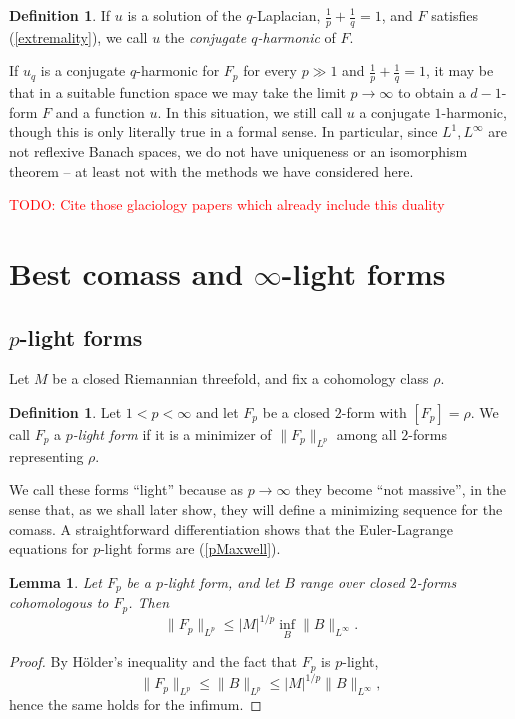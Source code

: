 \documentclass[reqno,11pt]{amsart}
\newcommand{\dfn}[1]{\emph{#1}\index{#1}}
\newtheorem{lemma}[theorem]{Lemma}
\theoremstyle{definition}
\newtheorem{definition}[theorem]{Definition}
\numberwithin{equation}{section}
\newcommand\todo[1]{\textcolor{red}{TODO: #1}}
\begin{document}
\begin{definition}
If $u$ is a solution of the $q$-Laplacian, $\frac{1}{p} + \frac{1}{q} = 1$, and $F$ satisfies (\ref{extremality}), we call $u$ the \dfn{conjugate $q$-harmonic} of $F$.
\end{definition}

If $u_q$ is a conjugate $q$-harmonic for $F_p$ for every $p \gg 1$ and $\frac{1}{p} + \frac{1}{q} = 1$, it may be that in a suitable function space we may take the limit $p \to \infty$ to obtain a $d-1$-form $F$ and a function $u$.
In this situation, we still call $u$ a conjugate $1$-harmonic, though this is only literally true in a formal sense.
In particular, since $L^1, L^\infty$ are not reflexive Banach spaces, we do not have uniqueness or an isomorphism theorem -- at least not with the methods we have considered here.

\todo{Cite those glaciology papers which already include this duality}


\section{Best comass and \texorpdfstring{$\infty$-light forms}{infinity-light forms}}
\subsection{\texorpdfstring{$p$-light forms}{p-light forms}}
Let $M$ be a closed Riemannian threefold, and fix a cohomology class $\rho$.

\begin{definition}
Let $1 < p < \infty$ and let $F_p$ be a closed $2$-form with $[F_p] = \rho$.
We call $F_p$ a \dfn{$p$-light form} if it is a minimizer of $\|F_p\|_{L^p}$ among all $2$-forms representing $\rho$.
\end{definition}

We call these forms ``light'' because as $p \to \infty$ they become ``not massive'', in the sense that, as we shall later show, they will define a minimizing sequence for the comass.
A straightforward differentiation shows that the Euler-Lagrange equations for $p$-light forms are (\ref{pMaxwell}).

\begin{lemma}
Let $F_p$ be a $p$-light form, and let $B$ range over closed $2$-forms cohomologous to $F_p$. Then
\begin{equation}\label{infinity magnetic rules p magnetic}
	\|F_p\|_{L^p} \leq |M|^{1/p} \inf_B \|B\|_{L^\infty}.
\end{equation}
\end{lemma}
\begin{proof}
By H\"older's inequality and the fact that $F_p$ is $p$-light,
$$\|F_p\|_{L^p} \leq \|B\|_{L^p} \leq |M|^{1/p} \|B\|_{L^\infty},$$
hence the same holds for the infimum.
\end{proof}
\end{document}
